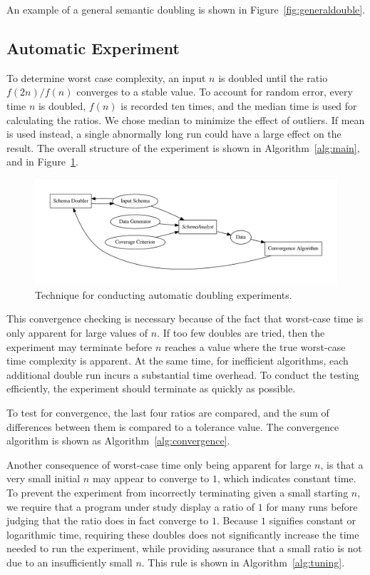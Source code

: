   An example of a general semantic doubling is shown in
  Figure~\ref{fig:generaldouble}.




  \subsection{Automatic Experiment}
  \label{subsec:experiment}

  To determine worst case complexity, an input $n$ is doubled until the 
  ratio $f(2n) / f(n)$ converges to a stable value. To account for random
  error, every time $n$ is doubled, $f(n)$ is recorded ten times, and the
  median time is used for calculating the ratios.  We chose
  median to minimize the effect of outliers. If mean is used instead, a
  single abnormally long run could have a large effect on the result. The overall 
  structure of the experiment is shown in Algorithm~\ref{alg:main}, and in
  Figure~\ref{fig:doublingexp}.

  \begin{figure}
    \centering
    \centering
    \includegraphics[width=.5\linewidth]{../diagrams/doublingexp.pdf}
    \caption{Technique for conducting automatic doubling experiments.}
    \label{fig:doublingexp}
  \end{figure}


  This convergence checking is necessary because of the fact that worst-case
  time is only apparent for large values of $n$. If too few doubles
  are tried, then the experiment may terminate before $n$ reaches a value
  where the true worst-case time complexity is apparent. At the same time,
  for inefficient  algorithms, each additional double run incurs a substantial
  time overhead. To conduct the testing efficiently, the experiment should
  terminate as quickly as possible.

  To test for convergence, the last four ratios are compared, and the
  sum of differences between them is compared to a tolerance value. The
  convergence algorithm is shown as Algorithm~\ref{alg:convergence}.

  Another consequence of worst-case time only being apparent for large
  $n$, is that a very small initial $n$ may appear to converge to $1$,
  which indicates constant time. To prevent the
  experiment from incorrectly terminating given a small starting $n$, we
  require that a program under study display a ratio of $1$ for many
  runs before judging that the ratio does in fact converge to $1$. Because 
  $1$ signifies constant or logarithmic 
  time, requiring these doubles does not significantly increase the time needed
  to run the experiment, while providing assurance that a small ratio is not due
  to an insufficiently small $n$. This rule is shown in 
  Algorithm~\ref{alg:tuning}.

